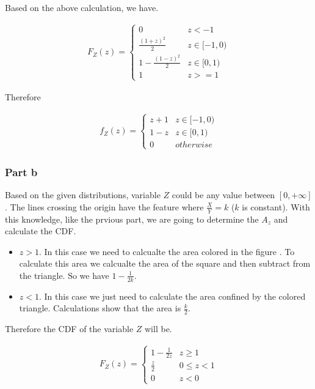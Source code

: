 \documentclass[12pt, a4paper]{book}
\begin{document}
Based on the above calculation, we have.

\begin{eqnarray*}
    F_Z(z) = \begin{cases}
        0 & z < -1 \\
        \frac{(1+z)^2}{2} & z \in [-1, 0) \\
        1 - \frac{(1-z)^2}{2} & z \in [0,1) \\
        1 & z >= 1
    \end{cases}
\end{eqnarray*}

Therefore

\begin{eqnarray*}
    f_Z(z) = \begin{cases}
        z+1      & z \in [-1, 0) \\
        1-z     & z \in [0,1) \\
        0                    & otherwise
    \end{cases}
\end{eqnarray*}

\subsubsection*{Part b}

Based on the given distributions, variable $Z$ could be any value between $[0, +\infty]$. The lines crossing the
origin have the feature where $\frac{X}{Y} = k$ ($k$ is constant). With this knowledge, like the prvious part,
we are going to determine the $A_z$ and calculate the CDF.

\begin{itemize}
    \item $z > 1$. In this case we need to calcualte the area colored in the figure {}. To calculate this
    area we calcualte the area of the square and then subtract from the triangle. So we have $1 - \frac{1}{2k}$.
    \item $z < 1$. In this case we just need to calculate the area confined by the colored triangle.
    Calculations show that the area is $\frac{k}{2}$.
\end{itemize}

Therefore the CDF of the variable $Z$ will be.

\begin{eqnarray*}
    F_Z(z) = \begin{cases}
        1 - \frac{1}{2z} & z \ge 1 \\
        \frac{z}{2} & 0 \le z < 1 \\
        0 & z < 0
    \end{cases}
\end{eqnarray*}
\end{document}
